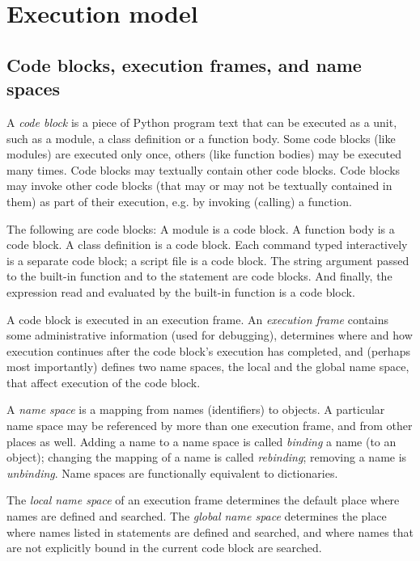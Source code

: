 \chapter{Execution model}

\section{Code blocks, execution frames, and name spaces} \label{execframes}

A {\em code block} is a piece of Python program text that can be
executed as a unit, such as a module, a class definition or a function
body.  Some code blocks (like modules) are executed only once, others
(like function bodies) may be executed many times.  Code blocks may
textually contain other code blocks.  Code blocks may invoke other
code blocks (that may or may not be textually contained in them) as
part of their execution, e.g. by invoking (calling) a function.

The following are code blocks:  A module is a code block.  A function
body is a code block.  A class definition is a code block.  Each
command typed interactively is a separate code block; a script file is
a code block.  The string argument passed to the built-in function
\verb@eval@ and to the \verb@exec@ statement are code blocks.
And finally, the
expression read and evaluated by the built-in function \verb@input@ is
a code block.

A code block is executed in an execution frame.  An {\em execution
frame} contains some administrative information (used for debugging),
determines where and how execution continues after the code block's
execution has completed, and (perhaps most importantly) defines two
name spaces, the local and the global name space, that affect
execution of the code block.

A {\em name space} is a mapping from names (identifiers) to objects.
A particular name space may be referenced by more than one execution
frame, and from other places as well.  Adding a name to a name space
is called {\em binding} a name (to an object); changing the mapping of
a name is called {\em rebinding}; removing a name is {\em unbinding}.
Name spaces are functionally equivalent to dictionaries.

The {\em local name space} of an execution frame determines the default
place where names are defined and searched.  The {\em global name
space} determines the place where names listed in \verb@global@
statements are defined and searched, and where names that are not
explicitly bound in the current code block are searched.

